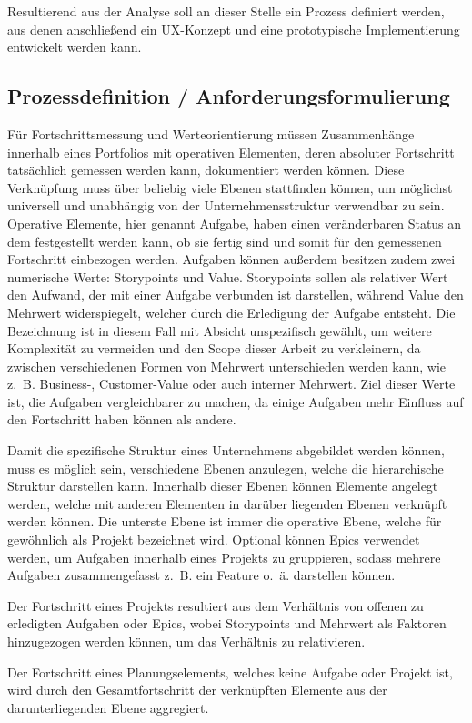 Resultierend aus der Analyse soll an dieser Stelle ein Prozess definiert werden, aus denen anschließend ein UX-Konzept und eine prototypische Implementierung entwickelt werden kann.
\subsection{Prozessdefinition / Anforderungsformulierung}
Für Fortschrittsmessung und Werteorientierung müssen Zusammenhänge innerhalb eines Portfolios mit operativen Elementen, deren absoluter Fortschritt tatsächlich gemessen werden kann, dokumentiert werden können. Diese Verknüpfung muss über beliebig viele Ebenen stattfinden können, um möglichst universell und unabhängig von der Unternehmensstruktur verwendbar zu sein.
Operative Elemente, hier genannt Aufgabe, haben einen veränderbaren Status an dem festgestellt werden kann, ob sie fertig sind und somit für den gemessenen Fortschritt einbezogen werden. Aufgaben können außerdem besitzen zudem zwei numerische Werte: Storypoints und Value. Storypoints sollen als relativer Wert den Aufwand, der mit einer Aufgabe verbunden ist darstellen, während Value den Mehrwert widerspiegelt, welcher durch die Erledigung der Aufgabe entsteht. Die Bezeichnung ist in diesem Fall mit Absicht unspezifisch gewählt, um weitere Komplexität zu vermeiden und den Scope dieser Arbeit zu verkleinern, da zwischen verschiedenen Formen von Mehrwert unterschieden werden kann, wie z. B. Business-, Customer-Value oder auch interner Mehrwert. Ziel dieser Werte ist, die Aufgaben vergleichbarer zu machen, da einige Aufgaben mehr Einfluss auf den Fortschritt haben können als andere.

Damit die spezifische Struktur eines Unternehmens abgebildet werden können, muss es möglich sein, verschiedene Ebenen anzulegen, welche die hierarchische Struktur darstellen kann. Innerhalb dieser Ebenen können Elemente angelegt werden, welche mit anderen Elementen in darüber liegenden Ebenen verknüpft werden können.
Die unterste Ebene ist immer die operative Ebene, welche für gewöhnlich als Projekt bezeichnet wird. Optional können Epics verwendet werden, um Aufgaben innerhalb eines Projekts zu gruppieren, sodass mehrere Aufgaben zusammengefasst z. B. ein Feature o. ä. darstellen können.

Der Fortschritt eines Projekts resultiert aus dem Verhältnis von offenen zu erledigten Aufgaben oder Epics, wobei Storypoints und Mehrwert als Faktoren hinzugezogen werden können, um das Verhältnis zu relativieren.

Der Fortschritt eines Planungselements, welches keine Aufgabe oder Projekt ist, wird durch den Gesamtfortschritt der verknüpften Elemente aus der darunterliegenden Ebene aggregiert.

